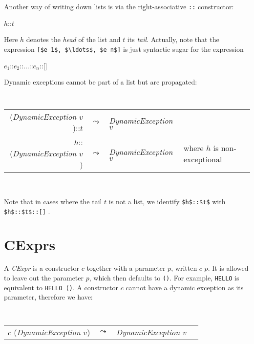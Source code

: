 \documentclass[11pt]{amsart}
\newcommand{\metababel}[1] {\textsl{#1}}
\newenvironment{babelcode}[0]{\begin{center}\tt}{\end{center}}
\newcommand{\babelsrc}[1] {\lstinline!#1!}
\begin{document}
Another way of writing down lists is via the right-associative \babelsrc{::} constructor:
\begin{babellisting}
$h$::$t$
\end{babellisting}
Here $h$ denotes the \emph{head} of the list and $t$ its \emph{tail}. Actually, note that the expression \babelsrc{[$e_1$, $\ldots$, $e_n$]} is just syntactic sugar for the expression
\begin{babellisting}
$e_1$::$e_2$::$\ldots$::$e_n$::[]
\end{babellisting}
Dynamic exceptions cannot be part of a list but are propagated:
\begin{babelcode}
\begin{tabular}{rcll}
(\metababel{DynamicException $v$})::$t$ & $\leadsto$ & \metababel{DynamicException $v$}&\\
$h$::(\metababel{DynamicException $v$}) & $\leadsto$ & \metababel{DynamicException $v$}& {\rm where $h$ is non-exceptional}\\
\end{tabular}\\
\end{babelcode}
Note that in cases where the tail $t$ is not a list, we identify \babelsrc{$h$::$t$} with  \babelsrc{$h$::$t$::[]} .

\section{CExprs}
A \metababel{CExpr} is a constructor $c$ together with a parameter $p$, written $c$ $p$. It is allowed to leave out the parameter $p$, which then defaults to \babelsrc{()}. For example,  \babelsrc{HELLO} is equivalent to \babelsrc{HELLO ()}. A constructor $c$ cannot have a dynamic exception as its parameter, therefore we have:
\begin{babelcode}
\begin{tabular}{rcll}
$c$ (\metababel{DynamicException $v$}) & $\leadsto$ & \metababel{DynamicException $v$}&\\
\end{tabular}\\
\end{babelcode}
\end{document}
